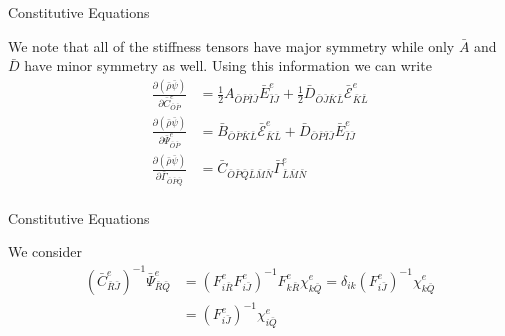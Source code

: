 \documentclass[11pt]{beamer}
\begin{document}
\begin{frame}{Constitutive Equations}

We note that all of the stiffness tensors have major symmetry while only $\bar{A}$ and $\bar{D}$ have minor symmetry as well. Using this information we can write
\begin{align*}
\frac{\partial \left(\bar{\rho} \bar{\psi}\right)}{\partial \bar{C}_{\bar{O}\bar{P}}^e} &= \frac{1}{2} A_{\bar{O}\bar{P} \bar{I}\bar{J}} \bar{E}_{\bar{I}\bar{J}}^e + \frac{1}{2} \bar{D}_{\bar{O}\bar{J}\bar{K}\bar{L}}\bar{\mathcal{E}}_{\bar{K}\bar{L}}^e\\
\frac{\partial \left(\bar{\rho}\bar{\psi}\right)}{\partial \bar{\Psi}_{\bar{O}\bar{P}}^e} &= \bar{B}_{\bar{O}\bar{P}\bar{K}\bar{L}} \bar{\mathcal{E}}_{\bar{K}\bar{L}}^e + \bar{D}_{\bar{O}\bar{P}\bar{I}\bar{J}}\bar{E}_{\bar{I}\bar{J}}^e\\
\frac{\partial \left(\bar{\rho}\bar{\psi}\right)}{\partial \bar{\Gamma}_{\bar{O}\bar{P}\bar{Q}}} &= \bar{C}_{\bar{O}\bar{P}\bar{Q}\bar{L}\bar{M}\bar{N}} \bar{\Gamma}_{\bar{L}\bar{M}\bar{N}}^e\\
\end{align*}

\end{frame}

\begin{frame}{Constitutive Equations}

We consider
\begin{align*}
\left(\bar{C}_{\bar{R}\bar{J}}^e\right)^{-1} \bar{\Psi}_{\bar{R}\bar{Q}}^e &= \left(F_{i\bar{R}}^e F_{i\bar{J}}^e\right)^{-1} F_{k\bar{R}}^e \chi_{k\bar{Q}}^e = \delta_{ik} \left(F_{i\bar{J}}^e\right)^{-1} \chi_{k\bar{Q}}^e\\
&= \left(F_{i\bar{J}}^e\right)^{-1} \chi_{i\bar{Q}}^e\\
\end{align*}

\end{frame}
\end{document}
